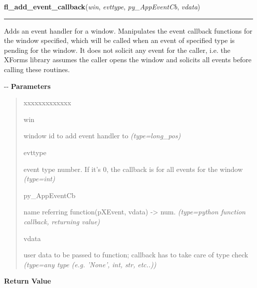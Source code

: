 \hspace{.8\funcindent}\begin{boxedminipage}{\funcwidth}

    \raggedright \textbf{fl\_add\_event\_callback}(\textit{win}, \textit{evttype}, \textit{py\_AppEventCb}, \textit{vdata})

    \vspace{-1.5ex}

    \rule{\textwidth}{0.5\fboxrule}
\setlength{\parskip}{2ex}

Adds an event handler for a window. Manipulates the event callback
functions for the window specified, which will be called when an
event of specified type is pending for the window. It does not
solicit any event for the caller, i.e. the XForms library assumes
the caller opens the window and solicits all events before calling
these routines.

-{}-
\setlength{\parskip}{1ex}
      \textbf{Parameters}
      \vspace{-1ex}

      \begin{quote}
        \begin{Ventry}{xxxxxxxxxxxxx}

          \item[win]


window id to add event handler to
            {\it (type=long\_pos)}

          \item[evttype]


event type number. If it's 0, the callback is for all events for the
window
            {\it (type=int)}

          \item[py\_AppEventCb]


name referring function(pXEvent, vdata) -> num.
            {\it (type=python function callback, returning value)}

          \item[vdata]


user data to be passed to function; callback has to take care of
type check
            {\it (type=any type (e.g. 'None', int, str, etc..))}

        \end{Ventry}

      \end{quote}

      \textbf{Return Value}
    \vspace{-1ex}


\end{boxedminipage}
